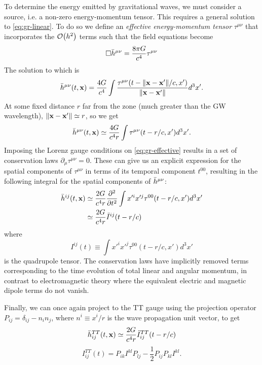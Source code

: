 To determine the energy emitted by gravitational waves, we must consider a source, i.e. a non-zero energy-momentum tensor.
This requires a general solution to \cref{eq:gr-linear}.
To do so we define an \textit{effective energy-momentum tensor} $\tau^{\mu\nu}$ that incorporates the $\order{h^2}$ terms such that the field equations become
\begin{equation}\label{eq:gr-effective}
	\Box \Bar{h}^{\mu\nu} = \frac{8\pi G}{c^4} \tau^{\mu\nu}
\end{equation}
The solution to which is
\begin{equation}
	\Bar{h}^{\mu\nu}(t, \mathbf{x}) = \frac{4G}{c^4} \int \frac{\tau^{\mu\nu}(t - \norm{\mathbf{x} - \mathbf{x'}}/c, x')}{\norm{\mathbf{x} - \mathbf{x'}}} d^3 x'.
\end{equation}
At some fixed distance $r$ far from the zone (much greater than the GW wavelength), $\norm{\mathbf{x} - \mathbf{x'}} \simeq r$, so we get
\begin{equation}
	\Bar{h}^{\mu\nu}(t, \mathbf{x}) \simeq \frac{4G}{c^4 r} \int \tau^{\mu\nu}(t - r/c, x') d^3 x'.
\end{equation}
Imposing the Lorenz gauge conditions on \cref{eq:gr-effective} results in a set of conservation laws $\partial_{\mu} \tau^{\mu\nu} = 0$.
These can give us an explicit expression for the spatial components of $\tau^{\mu\nu}$ in terms of its temporal component $t^{00}$, resulting in the following integral for the spatial components of $\Bar{h}^{\mu\nu}$:
\begin{align}
	\label{eq:gr-h}
	\Bar{h}^{ij}(t, \mathbf{x}) &\simeq \frac{2G}{c^4 r} \frac{\partial^2}{\partial t^2} \int x'^{i} x'^{j} \tau^{00}(t - r/c, x') d^3 x'\\
	&\simeq \frac{2G}{c^4 r} \ddot{I}^{ij}(t-r/c)
\end{align}
where
\begin{equation}
	I^{ij}(t) \equiv \int x'^{i} x'^{j} \tau^{00}(t - r/c, x') d^3 x'
\end{equation}
is the quadrupole tensor.
The conservation laws have implicitly removed terms corresponding to the time evolution of total linear and angular momentum, in contrast to electromagnetic theory where the equivalent electric and magnetic dipole terms do not vanish.

Finally, we can once again project to the TT gauge using the projection operator $P_{ij} = \delta_{ij} - n_i n_j$, where $n^i \equiv x^i / r$ is the wave propagation unit vector, to get
\begin{equation}\label{eq:gr-hTT}
	\Bar{h}^{TT}_{ij}(t, \mathbf{x}) \simeq \frac{2G}{c^4 r} \ddot{I}^{TT}_{ij}(t-r/c)
\end{equation}
\begin{equation}\label{eq:gr-ITT}
	I^{TT}_{ij}(t) = P_{ik} I^{kl} P_{lj} - \frac{1}{2} P_{ij} P_{kl} I^{kl}.
\end{equation}


